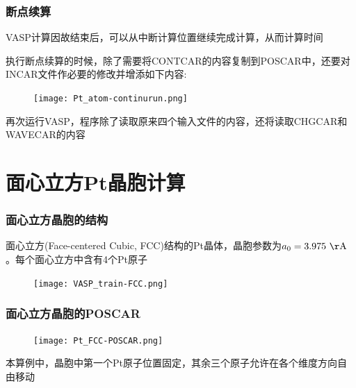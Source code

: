 \frame
{
	\frametitle{断点续算}
\textrm{VASP}计算因故结束后，可以从中断计算位置继续完成计算，从而计算时间

执行断点续算的时候，除了需要将\textrm{CONTCAR}的内容复制到\textrm{POSCAR}中，还要对\textrm{INCAR}文件作必要的修改并增添如下内容:
\begin{figure}[h!]
\centering
\vskip -5pt
\texttt{[image: Pt\_atom-continurun.png]}
\caption{\fontsize{6.2pt}{5.2pt}}%
\label{Pt_atom:continuruntime}
\end{figure}
再次运行\textrm{VASP}，程序除了读取原来四个输入文件的内容，还将读取\textrm{CHGCAR}和\textrm{WAVECAR}的内容%
}
\section{面心立方{\rm Pt}晶胞计算}\label{Sec:FCC-Pt}
\frame
{
	\frametitle{面心立方晶胞的结构}
	面心立方\textrm{(Face-centered Cubic, FCC)}结构的\textrm{Pt}晶体，晶胞参数为$a_0=3.975~\mathrm{\AA}$。每个面心立方中含有4个\textrm{Pt}原子
\begin{figure}[h!]
\centering
\texttt{[image: VASP\_train-FCC.png]}
\caption{\fontsize{6.2pt}{5.2pt}}%
\label{Pt_FCC:structure}
\end{figure}
}

\frame
{
	\frametitle{面心立方晶胞的\textrm{POSCAR}}
\begin{figure}[h!]
\centering
\texttt{[image: Pt\_FCC-POSCAR.png]}
\caption{\fontsize{6.2pt}{5.2pt}}%
\label{Pt_FCC:POSCAR}
\end{figure}
本算例中，晶胞中第一个\textrm{Pt}原子位置固定，其余三个原子允许在各个维度方向自由移动\\
{\fontsize{7.0pt}{5.2pt}}
}

